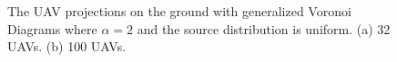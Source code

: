 \documentclass[12pt,onecolumn,journal,draftclsnofoot,letterpaper]{IEEEtran}
\newif\ifarxiv\arxivfalse
\begin{document}
\begin{figure}[t]
\centering
{}
\hfil
{}
\captionsetup{justification=justified}
\vspace{-2ex}
\caption{\small{The UAV projections on the ground with generalized Voronoi Diagrams where $\alpha=2$ and the source distribution is uniform. 
(a) 32 UAVs. (b) 100 UAVs.}}
\label{uniformDistortionPartition2}
\end{figure}
\ifarxiv
\end{document}

